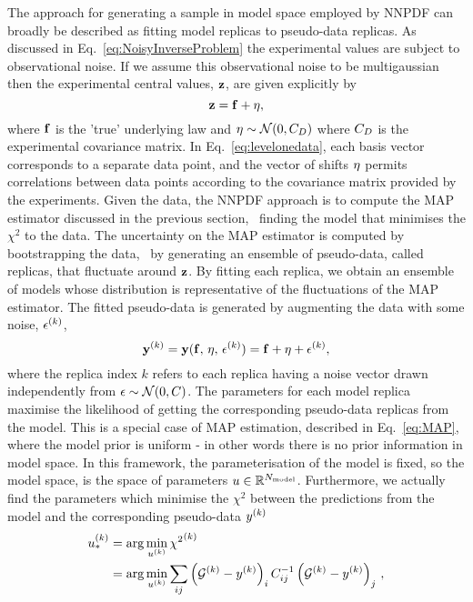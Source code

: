 The approach for generating a sample in model space employed by NNPDF can
broadly be described as fitting model replicas to pseudo-data replicas. As
discussed in Eq.~\eqref{eq:NoisyInverseProblem} the experimental values are
subject to observational noise. If we assume this observational noise to be
multigaussian then the experimental central values, $\mathbf{z}$, are given
explicitly by
\begin{equation}
    \label{eq:levelonedata}
    \mathbf{z} = \mathbf{f} + \mathbf{\eta},
\end{equation}
where $\mathbf{f}$ is the 'true' underlying law and $\mathbf{\eta} \sim
\mathcal{N}(0, C_D)$ where $C_D$ is the experimental covariance matrix. In
Eq.~\eqref{eq:levelonedata}, each basis vector corresponds to a separate data
point, and the vector of shifts $\mathbf{\eta}$ permits correlations between data
points according to the covariance matrix provided by the experiments. Given the
data, the NNPDF approach is to compute the MAP estimator discussed in the
previous section, \ie\ finding the model that minimises the $\chi^2$ to the
data. The uncertainty on the MAP estimator is computed by bootstrapping the
data, \ie\ by generating an ensemble of pseudo-data, called replicas, that
fluctuate around $\mathbf{z}$. By fitting each replica, we obtain an ensemble
of models whose distribution is representative of the fluctuations of the MAP
estimator. The fitted pseudo-data is generated by augmenting the data with some
noise, $\epsilon^{(k)}$,
\begin{equation}
    \label{eq:leveltwodata1}
    \mathbf{y}^{(k)}
    = \mathbf{y}(\mathbf{f},\,\mathbf{\eta},\,\mathbf{\epsilon}^{(k)})
    = \mathbf{f} + \mathbf{\eta} + \mathbf{\epsilon}^{(k)},
\end{equation}
where the replica index $k$ refers to each replica having a noise vector drawn
independently from $\mathbf{\epsilon} \sim \mathcal{N}(0, C)$. The parameters for
each model replica maximise the likelihood of getting the corresponding
pseudo-data replicas from the model. This is a special case of MAP estimation,
described in Eq.~\eqref{eq:MAP}, where the model prior is uniform - in other
words there is no prior information in model space. In this framework, the
parameterisation of the model is fixed, so the model space, is the space of
parameters $u \in \mathbb{R}^{N_{\rm model}}$. Furthermore, we actually find the
parameters which minimise the $\chi^2$ between the predictions from the model
and the corresponding pseudo-data $y^{(k)}$
\begin{equation}
    \begin{split}
        u^{(k)}_* &= \arg\min_{u^{(k)}} {\chi^2}^{(k)} \\
        &= \arg\min_{u^{(k)}} \sum_{ij} \left( \mathcal{G}^{(k)} - y^{(k)} \right)_i C^{-1}_{ij} \left( \mathcal{G}^{(k)} - y^{(k)} \right)_j\, ,
    \end{split}
\end{equation}
